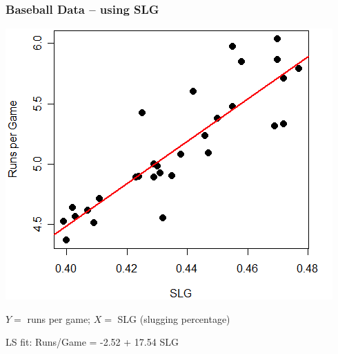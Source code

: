 \documentclass{beamer}
\begin{document}
\begin{frame}
\frametitle{Baseball Data -- using SLG} 

\vspace{-5.8mm}
\begin{center}
\includegraphics[scale=0.42]{figures/SlgR.png}
\end{center}

\vspace{-5.8mm}
$Y=$ runs per game; $X=$ SLG (slugging percentage)

\vspace{1mm}
LS fit: {\color{red} Runs/Game = -2.52 + 17.54 SLG}
\end{frame}
\end{document}
